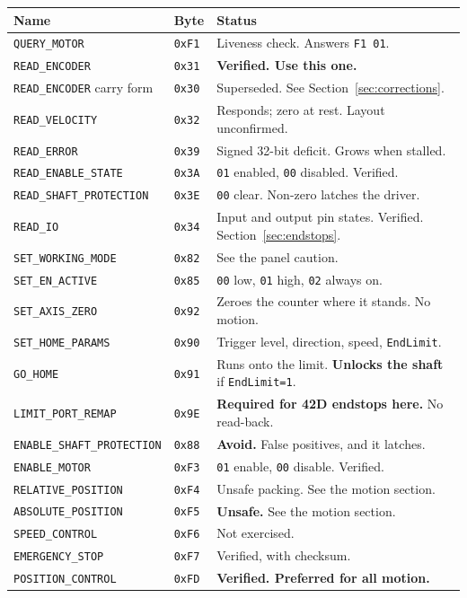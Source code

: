 \documentclass[11pt,letterpaper]{article}
\begin{document}
\begin{longtable}{lll}
\toprule
\textbf{Name} & \textbf{Byte} & \textbf{Status} \\ \midrule
\endhead
\texttt{QUERY\_MOTOR}       & \texttt{0xF1} & Liveness check. Answers \texttt{F1 01}. \\
\texttt{READ\_ENCODER}      & \texttt{0x31} & \textbf{Verified. Use this one.} \\
\texttt{READ\_ENCODER} carry form & \texttt{0x30} & Superseded. See Section~\ref{sec:corrections}. \\
\texttt{READ\_VELOCITY}     & \texttt{0x32} & Responds; zero at rest. Layout unconfirmed. \\
\texttt{READ\_ERROR}        & \texttt{0x39} & Signed 32-bit deficit. Grows when stalled. \\
\texttt{READ\_ENABLE\_STATE} & \texttt{0x3A} & \texttt{01} enabled, \texttt{00} disabled. Verified. \\
\texttt{READ\_SHAFT\_PROTECTION} & \texttt{0x3E} & \texttt{00} clear. Non-zero latches the driver. \\
\texttt{READ\_IO}             & \texttt{0x34} & Input and output pin states. Verified. Section~\ref{sec:endstops}. \\
\texttt{SET\_WORKING\_MODE} & \texttt{0x82} & See the panel caution. \\
\texttt{SET\_EN\_ACTIVE}    & \texttt{0x85} & \texttt{00} low, \texttt{01} high, \texttt{02} always on. \\
\texttt{SET\_AXIS\_ZERO}     & \texttt{0x92} & Zeroes the counter where it stands. No motion. \\
\texttt{SET\_HOME\_PARAMS}   & \texttt{0x90} & Trigger level, direction, speed, \texttt{EndLimit}. \\
\texttt{GO\_HOME}            & \texttt{0x91} & Runs onto the limit. \textbf{Unlocks the shaft} if \texttt{EndLimit=1}. \\
\texttt{LIMIT\_PORT\_REMAP}  & \texttt{0x9E} & \textbf{Required for 42D endstops here.} No read-back. \\
\texttt{ENABLE\_SHAFT\_PROTECTION} & \texttt{0x88} & \textbf{Avoid.} False positives, and it latches. \\
\texttt{ENABLE\_MOTOR}      & \texttt{0xF3} & \texttt{01} enable, \texttt{00} disable. Verified. \\
\texttt{RELATIVE\_POSITION} & \texttt{0xF4} & Unsafe packing. See the motion section. \\
\texttt{ABSOLUTE\_POSITION} & \texttt{0xF5} & \textbf{Unsafe.} See the motion section. \\
\texttt{SPEED\_CONTROL}     & \texttt{0xF6} & Not exercised. \\
\texttt{EMERGENCY\_STOP}    & \texttt{0xF7} & Verified, with checksum. \\
\texttt{POSITION\_CONTROL}  & \texttt{0xFD} & \textbf{Verified. Preferred for all motion.} \\
\bottomrule
\end{longtable}
\end{document}
